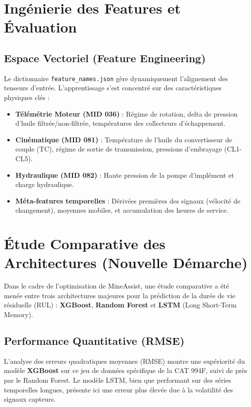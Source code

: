 \documentclass[12pt,a4paper]{report}
\begin{document}
\section{Ingénierie des Features et Évaluation}

\subsection{Espace Vectoriel (Feature Engineering)}
Le dictionnaire \texttt{feature\_names.json} gère dynamiquement l'alignement des tenseurs d'entrée. L'apprentissage s'est concentré sur des caractéristiques physiques clés :
\begin{itemize}
  \item \textbf{Télémétrie Moteur (MID 036)} : Régime de rotation, delta de pression d'huile filtrée/non-filtrée, températures des collecteurs d'échappement.
  \item \textbf{Cinématique (MID 081)} : Température de l'huile du convertisseur de couple (TC), régime de sortie de transmission, pressions d'embrayage (CL1-CL5).
  \item \textbf{Hydraulique (MID 082)} : Haute pression de la pompe d'implément et charge hydraulique.
  \item \textbf{Méta-features temporelles} : Dérivées premières des signaux (vélocité de changement), moyennes mobiles, et accumulation des heures de service.
\end{itemize}

\section{Étude Comparative des Architectures (Nouvelle Démarche)}

Dans le cadre de l'optimisation de MineAssist, une étude comparative a été menée entre trois architectures majeures pour la prédiction de la durée de vie résiduelle (RUL) : \textbf{XGBoost}, \textbf{Random Forest} et \textbf{LSTM} (Long Short-Term Memory).

\subsection{Performance Quantitative (RMSE)}
L'analyse des erreurs quadratiques moyennes (RMSE) montre une supériorité du modèle \textbf{XGBoost} sur ce jeu de données spécifique de la CAT 994F, suivi de près par le Random Forest. Le modèle LSTM, bien que performant sur des séries temporelles longues, présente ici une erreur plus élevée due à la volatilité des signaux capteurs.
\end{document}
